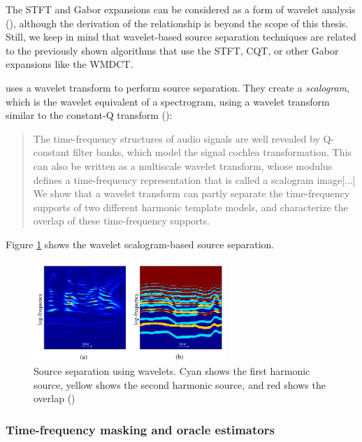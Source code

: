 \documentclass[report.tex]{subfiles}
\begin{document}
The STFT and Gabor expansions can be considered as a form of wavelet analysis (\cite{gaborwavelet1, gaborwavelet2}), although the derivation of the relationship is beyond the scope of this thesis. Still, we keep in mind that wavelet-based source separation techniques are related to the previously shown algorithms that use the STFT, CQT, or other Gabor expansions like the WMDCT.

\textcite{wavelets} uses a wavelet transform to perform source separation. They create a \textit{scalogram}, which is the wavelet equivalent of a spectrogram, using a wavelet transform similar to the constant-Q transform (\cite[2--3]{wavelets}):

\begin{quote}
	The time-frequency structures of audio signals are well revealed by Q-constant filter banks, which model the signal cochlea transformation. This can also be written as a multiscale wavelet transform, whose modulus defines a time-frequency representation that is called a scalogram image[...] We show that a wavelet transform can partly separate the time-frequency supports of two different harmonic template models, and characterize the overlap of these time-frequency supports.
\end{quote}

Figure \ref{fig:waveletsep} shows the wavelet scalogram-based source separation.

\begin{figure}[ht]
	\centering
	\includegraphics[width=0.65\textwidth]{./images-wavelets/wavelet_sep.png}
	\caption{Source separation using wavelets. Cyan shows the first harmonic source, yellow shows the second harmonic source, and red shows the overlap (\cite[5]{wavelets})}
	\label{fig:waveletsep}
\end{figure}

\subsubsection{Time-frequency masking and oracle estimators}
\label{sec:masksandoracles}
\end{document}
